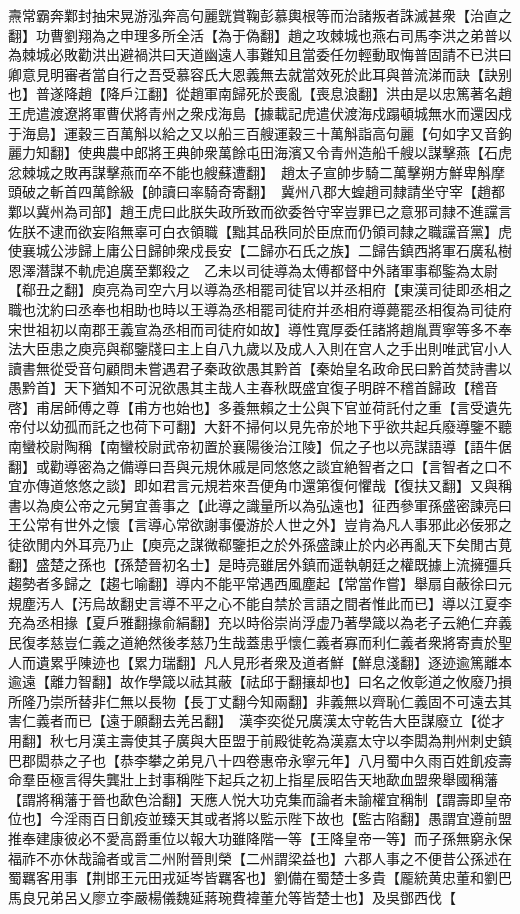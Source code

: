 燾常霸奔鄴封抽宋晃游泓奔高句麗皝賞鞠彭慕輿根等而治諸叛者誅滅甚衆【治直之翻】功曹劉翔為之申理多所全活【為于偽翻】趙之攻棘城也燕右司馬李洪之弟普以為棘城必敗勸洪出避禍洪曰天道幽遠人事難知且當委任勿輕動取悔普固請不已洪曰卿意見明審者當自行之吾受慕容氏大恩義無去就當效死於此耳與普流涕而訣【訣别也】普遂降趙【降戶江翻】從趙軍南歸死於喪亂【喪息浪翻】洪由是以忠篤著名趙王虎遣渡遼將軍曹伏將青州之衆戍海島【據載記虎遣伏渡海戍蹋頓城無水而還因戍于海島】運穀三百萬斛以給之又以船三百艘運穀三十萬斛詣高句麗【句如字又音鉤麗力知翻】使典農中郎將王典帥衆萬餘屯田海濱又令青州造船千艘以謀擊燕【石虎忿棘城之敗再謀擊燕而卒不能也艘蘇遭翻】　趙太子宣帥步騎二萬擊朔方鮮卑斛摩頭破之斬首四萬餘級【帥讀曰率騎奇寄翻】　冀州八郡大蝗趙司隸請坐守宰【趙都鄴以冀州為司部】趙王虎曰此朕失政所致而欲委咎守宰豈罪已之意邪司隸不進讜言佐朕不逮而欲妄陷無辜可白衣領職【黜其品秩同於臣庶而仍領司隸之職讜音黨】虎使襄城公涉歸上庸公日歸帥衆戍長安【二歸亦石氏之族】二歸告鎮西將軍石廣私樹恩澤潛謀不軌虎追廣至鄴殺之　乙未以司徒導為太傅都督中外諸軍事郗鍳為太尉【郗丑之翻】庾亮為司空六月以導為丞相罷司徒官以并丞相府【東漢司徒即丞相之職也沈約曰丞奉也相助也時以王導為丞相罷司徒府并丞相府導薨罷丞相復為司徒府宋世祖初以南郡王義宣為丞相而司徒府如故】導性寬厚委任諸將趙胤賈寧等多不奉法大臣患之庾亮與郗鑒牋曰主上自八九歲以及成人入則在宫人之手出則唯武官小人讀書無從受音句顧問未嘗遇君子秦政欲愚其黔首【秦始皇名政命民曰黔首焚詩書以愚黔首】天下猶知不可況欲愚其主哉人主春秋既盛宜復子明辟不稽首歸政【稽音啓】甫居師傅之尊【甫方也始也】多養無賴之士公與下官並荷託付之重【言受遺先帝付以幼孤而託之也荷下可翻】大姧不掃何以見先帝於地下乎欲共起兵廢導鑒不聽南蠻校尉陶稱【南蠻校尉武帝初置於襄陽後治江陵】侃之子也以亮謀語導【語牛倨翻】或勸導密為之備導曰吾與元規休戚是同悠悠之談宜絶智者之口【言智者之口不宜亦傳道悠悠之談】即如君言元規若來吾便角巾還第復何懼哉【復扶又翻】又與稱書以為庾公帝之元舅宜善事之【此導之識量所以為弘遠也】征西參軍孫盛密諫亮曰王公常有世外之懷【言導心常欲謝事優游於人世之外】豈肯為凡人事邪此必佞邪之徒欲閒内外耳亮乃止【庾亮之謀微郗鑒拒之於外孫盛諫止於内必再亂天下矣閒古莧翻】盛楚之孫也【孫楚晉初名士】是時亮雖居外鎮而遥執朝廷之權既據上流擁彊兵趨勢者多歸之【趨七喻翻】導内不能平常遇西風塵起【常當作嘗】舉扇自蔽徐曰元規塵汚人【汚烏故翻史言導不平之心不能自禁於言語之間者惟此而已】導以江夏李充為丞相掾【夏戶雅翻掾俞絹翻】充以時俗崇尚浮虚乃著學箴以為老子云絶仁弃義民復孝慈豈仁義之道絶然後孝慈乃生哉蓋患乎懷仁義者寡而利仁義者衆將寄責於聖人而遺累乎陳迹也【累力瑞翻】凡人見形者衆及道者鮮【鮮息淺翻】逐迹逾篤離本逾遠【離力智翻】故作學箴以祛其蔽【祛邱于翻攘却也】曰名之攸彰道之攸廢乃損所隆乃崇所替非仁無以長物【長丁丈翻今知兩翻】非義無以齊恥仁義固不可遠去其害仁義者而已【遠于願翻去羌呂翻】　漢李奕從兄廣漢太守乾告大臣謀廢立【從才用翻】秋七月漢主壽使其子廣與大臣盟于前殿徙乾為漢嘉太守以李閎為荆州刺史鎮巴郡閎恭之子也【恭李攀之弟見八十四卷惠帝永寧元年】八月蜀中久雨百姓飢疫壽命羣臣極言得失龔壯上封事稱陛下起兵之初上指星辰昭告天地歃血盟衆舉國稱藩【謂將稱藩于晉也歃色洽翻】天應人悦大功克集而論者未諭權宜稱制【謂壽即皇帝位也】今淫雨百日飢疫並臻天其或者將以監示陛下故也【監古陷翻】愚謂宜遵前盟推奉建康彼必不愛高爵重位以報大功雖降階一等【王降皇帝一等】而子孫無窮永保福祚不亦休哉論者或言二州附晉則榮【二州謂梁益也】六郡人事之不便昔公孫述在蜀羈客用事【荆邯王元田戎延岑皆羈客也】劉備在蜀楚士多貴【龎統黄忠董和劉巴馬良兄弟呂乂廖立李嚴楊儀魏延蔣琬費褘董允等皆楚士也】及吳鄧西伐【